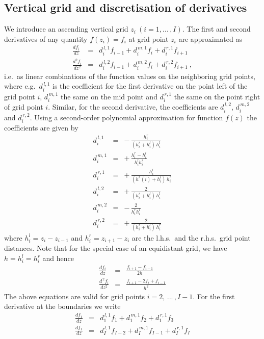 \documentclass[11pt]{article}
\begin{document}
\subsection{Vertical grid and discretisation of derivatives}
We introduce an ascending vertical grid $z_i\ (i=1, ...\,,I)$. The first and
second derivatives of any quantity $f(z_i)=f_i$ at grid point $z_i$ 
are approximated as
\begin{eqnarray}
  \frac{df_i}{dz}     
  &=& d^{\,l,1}_if_{i-1} + d^{\,m,1}_if_i + d^{\,r,1}_if_{i+1} \\ 
  \frac{d^2f_i}{dz^2} 
  &=& d^{\,l,2}_if_{i-1} + d^{\,m,2}_if_i + d^{\,r,2}_if_{i+1} \ ,
\end{eqnarray}
i.e.\ as linear combinations of the function values on the
neighboring grid points, where e.g.\ $d^{\,l,1}_i$ is the coefficient
for the first derivative on the point left of the grid point $i$,
$d^{\,m,1}_i$ the same on the mid point and $d^{\,r,1}_i$ the same on
the point right of grid point $i$. Similar, for the second derivative,
the coefficients are $d^{\,l,2}_i$, $d^{\,m,2}_i$ and
$d^{\,r,2}_i$. Using a second-order polynomial approximation for
function $f(z)$ the coefficients are given by
\begin{eqnarray}
  d^{\,l,1}_i &=& -\,\frac{h^r_i}{(h^r_i+h^l_i)\,h^l_i}   \\
  d^{\,m,1}_i &=& +\,\frac{h^r_i-h^l_i}{h^l_i h^r_i}     \\
  d^{\,r,1}_i &=& +\,\frac{h^l_i}{(h^r(i)+h^l_i)\,h^r_i}  \\
  d^{\,l,2}_i &=& +\,\frac{2}{(h^r_i+h^l_i)\,h^l_i}      \\
  d^{\,m,2}_i &=& -\,\frac{2}{h^r_i h^l_i}             \\
  d^{\,r,2}_i &=& +\,\frac{2}{(h^r_i+h^l_i)\,h^r_i}      
\end{eqnarray}   
where $h^l_i=z_i-z_{i-1}$ and $h^r_i=z_{i+1}-z_i$ are the l.h.s.\
and the r.h.s.\  grid point distances. Note that for the special case of
an equidistant grid, we have $h=h^l_i=h^r_i$ and hence
\begin{eqnarray}
  \frac{df_i}{dz}     &=& \frac{f_{i+1}-f_{i-1}}{2h} \\
  \frac{d^{\,2}\!f_i}{dz^2} &=& \frac{f_{i+1}-2f_i+f_{i-1}}{h^2}
\end{eqnarray}
The above equations are valid for grid points $i=2,\,...\,,I-1$.
For the first derivative at the boundaries we write
\begin{eqnarray}
  \frac{df_1}{dz}     
  &=& d^{\,l,1}_1f_{1} + d^{\,m,1}_1f_{2} + d^{\,r,1}_1f_{3} \\ 
  \frac{df_1}{dz}     
  &=& d^{\,l,1}_If_{I-2} + d^{\,m,1}_If_{I-1} + d^{\,r,1}_If_{I} 
\end{eqnarray}
\end{document}
